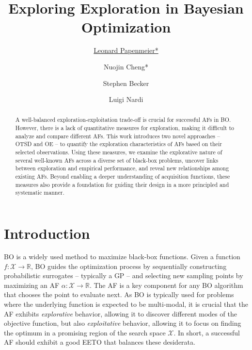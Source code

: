 \documentclass[accepted]{uai2025}
\title{Exploring Exploration in Bayesian Optimization}
\author[1]{\href{mailto:<leonard.papenmeier@cs.lth.se>?Subject=Your paper}{Leonard Papenmeier*}{}}
\author[2]{Nuojin Cheng*}
\author[2]{Stephen Becker}
\author[1, 3]{Luigi Nardi}
\affil[1]{%
    Department of Computer Science\\
    Lund University\\
    Lund, Sweden
}
\affil[2]{%
    Department of Applied Mathematics\\
    University of Colorado Boulder\\
    Boulder, Colorado, USA
  }
\affil[3]{%
    DBtune
}
\begin{document}
\maketitle
\begin{abstract}
    A well-balanced exploration-exploitation trade-off is crucial for successful \aclp{AF} in \acl{BO}.
    However, there is a lack of quantitative measures for exploration, making it difficult to analyze and compare different \aclp{AF}.
    This work introduces two novel approaches -- \acl{OTSD} and \acl{OE} -- to quantify the exploration characteristics of \aclp{AF} based on their selected observations.
    Using these measures, we examine the explorative nature of several well-known \aclp{AF} across a diverse set of black-box problems, uncover links between exploration and empirical performance, and reveal new relationships among existing \aclp{AF}.
    Beyond enabling a deeper understanding of acquisition functions, these measures also provide a foundation for guiding their design in a more principled and systematic manner.
\end{abstract}

\section{Introduction}
\label{sec:intro}
\def\thefootnote{*}\def\thefootnote{\arabic{footnote}}
\ac{BO} is a widely used method to maximize black-box functions. 
Given a function $f:\mathcal{X}\to\mathbb{R}$, \ac{BO} guides the optimization process by sequentially constructing probabilistic surrogates -- typically a \ac{GP} -- and selecting new sampling points by maximizing an \ac{AF} $\alpha:\mathcal{X}\to\mathbb{R}$.
The \Ac{AF} is a key component for any \ac{BO} algorithm that chooses the point to evaluate next.
As \ac{BO} is typically used for problems where the underlying function is expected to be multi-modal, it is crucial that the \ac{AF} exhibits \emph{explorative} behavior, allowing it to discover different modes of the objective function, but also \emph{exploitative} behavior, allowing it to focus on finding the optimum in a promising region of the search space $\mathcal{X}$.
In short, a successful \ac{AF} should exhibit a good \acf{EETO} that balances these desiderata.
\end{document}
